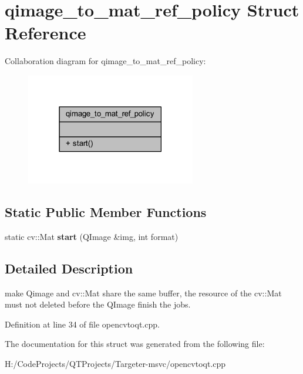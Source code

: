 \hypertarget{structqimage__to__mat__ref__policy}{}\section{qimage\+\_\+to\+\_\+mat\+\_\+ref\+\_\+policy Struct Reference}
\label{structqimage__to__mat__ref__policy}


Collaboration diagram for qimage\+\_\+to\+\_\+mat\+\_\+ref\+\_\+policy\+:
\nopagebreak
\begin{figure}[H]
\begin{center}
\leavevmode
\includegraphics[width=210pt]{structqimage__to__mat__ref__policy__coll__graph}
\end{center}
\end{figure}
\subsection*{Static Public Member Functions}
\begin{DoxyCompactItemize}
\item 
\mbox{\label{structqimage__to__mat__ref__policy_af2b9a582568ee050aac9da25b3f8c9ea}} 
static cv\+::\+Mat {\bfseries start} (Q\+Image \&img, int format)
\end{DoxyCompactItemize}


\subsection{Detailed Description}
make Qimage and cv\+::\+Mat share the same buffer, the resource of the cv\+::\+Mat must not deleted before the Q\+Image finish the jobs. 

Definition at line 34 of file opencvtoqt.\+cpp.



The documentation for this struct was generated from the following file\+:\begin{DoxyCompactItemize}
\item 
H\+:/\+Code\+Projects/\+Q\+T\+Projects/\+Targeter-\/msvc/opencvtoqt.\+cpp\end{DoxyCompactItemize}
